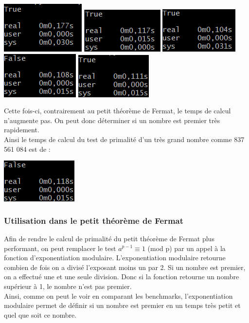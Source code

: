 \includegraphics[scale=1]{images/expo1.png}
\includegraphics[scale=1]{images/expo2.png}
\includegraphics[scale=1]{images/expo3.png}
\includegraphics[scale=1]{images/expo4.png}
\includegraphics[scale=1]{images/expo5.png}

Cette fois-ci, contrairement au petit théorème de Fermat, le temps de calcul n'augmente pas. On peut donc déterminer si un nombre est premier très rapidement.\\
Ainsi le temps de calcul du test de primalité d'un très grand nombre comme 837 561 084 est de :

\includegraphics[scale=1]{images/expo6.png}

\subsubsection{Utilisation dans le petit théorème de Fermat}
Afin de rendre le calcul de primalité du petit théorème de Fermat plus performant, on peut remplacer le test $a^{p-1} \equiv 1$ (mod p) par un appel à la fonction d'exponentiation modulaire. L'exponentiation modulaire retourne combien de fois on a divisé l'exposant moins un par 2. Si un nombre est premier, on a effectué une et une seule division. Donc si la fonction retourne un nombre supérieur à 1, le nombre n'est pas premier.\\
Ainsi, comme on peut le voir en comparant les benchmarks, l'exponentiation modulaire permet de définir si un nombre est premier en un temps très petit et quel que soit ce nombre.